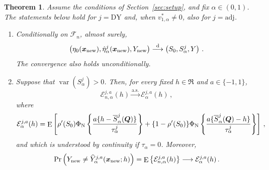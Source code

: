 \documentclass{article}
\DeclareMathOperator{\expect}{E}
\DeclareMathOperator{\var}{var}
\newtheorem{theorem}{Theorem}[section]
\theoremstyle{definition}
\newcommand*{\bb}{\boldsymbol}
\def\bx{\bb{x}}
\begin{document}
\begin{bibunit}
\begingroup
\renewcommand{\thetheorem}{\arabic{theorem}}
\setcounter{theorem}{1}
\begin{theorem}
\label{thm:prediction-classification}
Assume the conditions of Section~\ref{sec:setup}, and fix
$\alpha\in(0,1)$. The statements below hold for $j=\mathrm{DY}$ and, when
$v_{1,\alpha}^*\neq0$, also for $j=\mathrm{adj}$.
\begin{enumerate}[label=(\roman*)]
    \item Conditionally on $\mathcal F_n$, almost surely,
    \begin{equation}
    \label{eq:prediction-joint-limit}
        \left(
            \eta_0(\bx_{\rm new}),
            \hat\eta_\alpha^j(\bx_{\rm new}),
            Y_{\rm new}
        \right)
        \overset{\mathrm d}{\longrightarrow}
        \left(
            S_0,
            S_\alpha^j,
            Y
        \right) \,.
    \end{equation}
    The convergence also holds unconditionally.
    \item Suppose that $\var(S_\alpha^j)>0$. Then, for every fixed
    $h\in\Re$ and $a\in\{-1,1\}$,
    \begin{equation}
    \label{eq:prediction-risk-convergence}
        \mathcal E_{n,\alpha}^{j,a}(h)
        \overset{\mathrm{a.s.}}{\longrightarrow}
        \mathcal E_\alpha^{j,a}(h) \,,
    \end{equation}
    where
    \begin{equation}
    \label{eq:prediction-limiting-risk}
        \mathcal E_\alpha^{j,a}(h)
        =
        \expect\left[
            \rho'(S_0)
            \Phi_{\rm N}\left\{
                \frac{
                    a\{h-\overline S_\alpha^j(\bb Q)\}
                }{
                    \tau_\alpha^j
                }
            \right\}
            +
            \{1-\rho'(S_0)\}
            \Phi_{\rm N}\left\{
                \frac{
                    a\{\overline S_\alpha^j(\bb Q)-h\}
                }{
                    \tau_\alpha^j
                }
            \right\}
        \right] \,,
    \end{equation}
    and which is understood by continuity if $\tau_\alpha = 0$. Moreover,
    \begin{equation}
    \label{eq:prediction-unconditional-risk-convergence}
        \Pr\left(
            Y_{\rm new}
            \neq
            \widehat Y_\alpha^{j,a}(\bx_{\rm new};h)
        \right)
        =
        \expect\left\{
            \mathcal E_{n,\alpha}^{j,a}(h)
        \right\}
        \longrightarrow
        \mathcal E_\alpha^{j,a}(h) \,.
    \end{equation}
\end{enumerate}
\end{theorem}
\endgroup


\end{bibunit}
\end{document}
